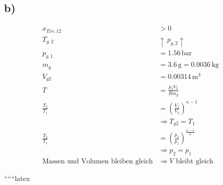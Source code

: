 

\subsection*{b)}
\begin{align*}
    x_{Eis,12} &> 0 \\
    T_{g,2} &\uparrow \, p_{g,2} \uparrow \\
    p_{g,1} &= 1.56 \, \text{bar} \\
    m_g &= 3.6 \, \text{g} = 0.0036 \, \text{kg} \\
    V_{g2} &= 0.00314 \, \text{m}^3 \\
    T &= \frac{p_2 V_2}{R m_g} \\
    \frac{T_2}{T_1} &= \left( \frac{V_1}{V_2} \right)^{\kappa - 1} \\
    &\Rightarrow T_{g2} = T_1 \\
    \frac{T_2}{T_1} &= \left( \frac{p_2}{p_1} \right)^{\frac{\kappa - 1}{\kappa}} \\
    &\Rightarrow p_2 = p_1 \\
    \text{Massen und Volumen bleiben gleich} &\Rightarrow V \text{ bleibt gleich}
\end{align*}

``````latex